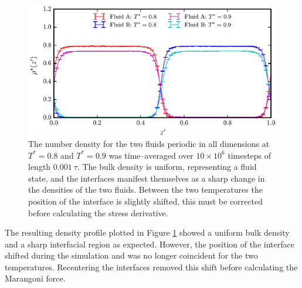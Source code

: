 \begin{figure}[h!]
\centering
\includegraphics[scale=1.0]{Period10Rho}
\caption{The number density for the two fluids periodic in all dimensions at $T^{*} = 0.8$ and $T^{*} = 0.9$ was time--averaged over $10 \times 10^{6}$ timesteps of length $0.001\ \tau$. 
The bulk density is uniform, representing a fluid state, and the interfaces manifest themselves as a sharp change in the densities of the two fluids.
Between the two temperatures the position of the interface is slightly shifted, this must be corrected before calculating the stress derivative.
}
\label{Period10Rho}
\end{figure}
The resulting density profile plotted in Figure \ref{Period10Rho} showed a uniform bulk density and a sharp interfacial region as expected.
However, the position of the interface shifted during the simulation and was no longer coincident for the two temperatures.
Recentering the interfaces removed this shift before calculating the Marangoni force.
\FloatBarrier

